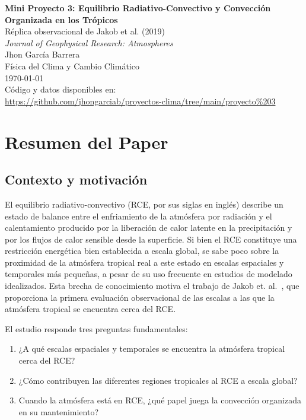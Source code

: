\documentclass[12pt, a4paper]{article}
\begin{document}
	
	\begin{titlepage}
		\centering
		\vspace*{2cm}
		{\LARGE \textbf{Mini Proyecto 3: Equilibrio Radiativo-Convectivo y Convección Organizada en los Trópicos}\\[0.5em]
			\large Réplica observacional de Jakob et al. (2019)\\
			\textit{Journal of Geophysical Research: Atmospheres}}\\[2cm]
		{\large Jhon García Barrera}\\[0.5em]
		{\normalsize Física del Clima y Cambio Climático}\\[0.5em]
		{\normalsize \today}\\[3cm]
		\vfill
		{\small Código y datos disponibles en:\\
			\url{https://github.com/jhongarciab/proyectos-clima/tree/main/proyecto%203}}
	\end{titlepage}
	
	\tableofcontents
	\newpage

\section{Resumen del Paper}

\subsection{Contexto y motivación}

El equilibrio radiativo-convectivo (RCE, por sus siglas en inglés) describe un estado de balance entre el enfriamiento de la atmósfera por radiación y el calentamiento producido por la liberación de calor latente en la precipitación y por los flujos de calor sensible desde la superficie. Si bien el RCE constituye una restricción energética bien establecida a escala global, se sabe poco sobre la proximidad de la atmósfera tropical real a este estado en escalas espaciales y temporales más pequeñas, a pesar de su uso frecuente en estudios de modelado idealizados. Esta brecha de conocimiento motiva el trabajo de Jakob et. al.~\cite{jakob2019rce}, que proporciona la primera evaluación observacional de las escalas a las que la atmósfera tropical se encuentra cerca del RCE.

El estudio responde tres preguntas fundamentales:
\begin{enumerate}
	\item ¿A qué escalas espaciales y temporales se encuentra la atmósfera tropical cerca del RCE?
	\item ¿Cómo contribuyen las diferentes regiones tropicales al RCE a escala global?
	\item Cuando la atmósfera está en RCE, ¿qué papel juega la convección organizada en su mantenimiento?
\end{enumerate}
\end{document}
